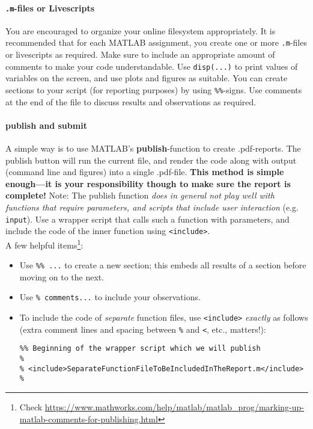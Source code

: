 \documentclass[11pt,noanswers,addpoints]{exam}
\begin{document}
\paragraph{\texttt{.m}-files or Livescripts}
You are encouraged to organize your online filesystem appropriately. It is recommended that for each MATLAB assignment, you create one or more \texttt{.m}-files or livescripts as required. Make sure to include an appropriate amount of comments to make your code understandable. Use \texttt{disp(...)} to print values of variables on the screen, and use plots and figures as suitable. You can create sections to your script (for reporting purposes) by using \texttt{\%\%}-signs. Use comments at the end of the file to discuss results and observations as required. 

\paragraph{publish and submit}
A simple way is to use MATLAB's \textbf{publish}-function to create .pdf-reports. The publish button will run the current file, and render the code along with output (command line and figures) into a single .pdf-file. \textbf{This method is simple enough---it is your responsibility though to make sure the report is complete!} Note: The publish function \emph{does in general not play well with functions that require parameters, and scripts that include user interaction} (e.g. \texttt{input}). Use a wrapper script that calls such a function with parameters, and include the code of the inner function using \texttt{<include>}.\\

A few helpful items\footnote{Check \url{https://www.mathworks.com/help/matlab/matlab_prog/marking-up-matlab-comments-for-publishing.html}}:
\begin{itemize}
\item Use \verb|%% ...| to create a new section; this embeds all results of a section before moving on to the next.
\item Use \verb|% comments...| to include your observations.
\item To include the code of \emph{separate} function files, use \texttt{<include>} \emph{exactly} as follows (extra comment lines and spacing between \verb|%| and \verb|<|, etc., matters!):
\begin{verbatim}
%% Beginning of the wrapper script which we will publish
%
% <include>SeparateFunctionFileToBeIncludedInTheReport.m</include>
%
\end{verbatim}
\end{itemize}
\end{document}
